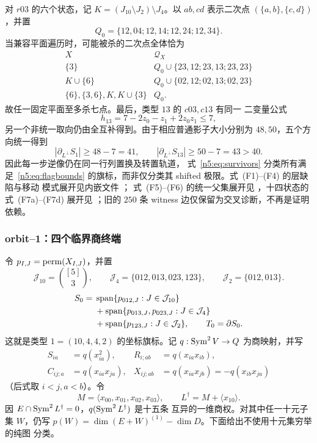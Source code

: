 对 \(r03\) 的六个状态，记
\(K=(J_{10}\setminus J_2)\setminus J_4\)。以 \(ab,cd\) 表示二次点
\((\{a,b\},\{c,d\})\)，并置
\[
Q_0=\{12,04;12,14;12,24;12,34\}.
\]
当兼容平面遍历时，可能被杀的二次点全体恰为
\[
\begin{array}{c|c}
X&\mathcal Q_X\\ \hline
\{3\}&Q_0\cup\{23,12;23,13;23,23\}\\
K\cup\{6\}&Q_0\cup\{02,12;02,13;02,23\}\\
\{6\},\{3,6\},K,K\cup\{3\}&Q_0.
\end{array}                                                     \tag{F7c}
\]
故任一固定平面至多杀七点。最后，类型 \(13\) 的 \(c03,c13\) 有同一
二变量公式
\[
h_{13}=7-2z_0-z_1+2z_0z_1\le7,                              \tag{F7d}
\]
另一个非统一取向仍由全互补得到。由于相应普通影子大小分别为
\(48,50\)，五个方向统一得到
\[
|\partial_{L^\perp}S_1|\ge48-7=41,\qquad
|\partial_{L^\perp}S_{13}|\ge50-7=43>40.                    \tag{F7}
\]
因此每一步逆像仍在同一行列置换及转置轨道，
式~\eqref{n5:eq:survivors} 分类所有满足~\eqref{n5:eq:flagbounds}
的旗标，而非仅分类其 shifted 极限。式~(F1)--(F4) 的层缺陷与移动
模式展开见内嵌文件
；
式~(F5)--(F6) 的统一父集展开见
，十四状态的
式~(F7a)--(F7d) 展开见
；旧的
\(250\) 条 witness 边仅保留为交叉诊断，不再是证明依赖。

\subsubsection{orbit--1：四个临界商终端}

令 \(p_{I,J}=\operatorname{perm}(X_{I,J})\)，并置
\[
\mathcal J_{10}=\binom{[5]}3,\qquad
\mathcal J_4=\{012,013,023,123\},\qquad
\mathcal J_2=\{012,013\}.
\]
\[
\begin{aligned}
 S_0={}&\operatorname{span}\{p_{012,J}:J\in\mathcal J_{10}\}\\
 &+\operatorname{span}\{p_{013,J},p_{023,J}:J\in\mathcal J_4\}\\
 &+\operatorname{span}\{p_{123,J}:J\in\mathcal J_2\},
 \qquad T_0=\partial S_0 .
\end{aligned}
\]
这就是类型 \(1=(10,4,4,2)\) 的坐标旗标。记 \(q:\operatorname{Sym}^2V\to Q\)
为商映射，并写
\[
\begin{aligned}
S_{ia}&=q(x_{ia}^2),&
R_{i;ab}&=q(x_{ia}x_{ib}),\\
C_{ij;a}&=q(x_{ia}x_{ja}),&
X_{ij;ab}&=q(x_{ia}x_{jb})=-q(x_{ib}x_{ja})
\end{aligned}
\]
（后式取 \(i<j,a<b\)）。令
\[
 M=\langle x_{00},x_{01},x_{02},x_{03}\rangle,\qquad
 L^\dagger=M+\langle x_{10}\rangle .
\]
因 \(E\cap\operatorname{Sym}^2L^\dagger=0\)，\(q(\operatorname{Sym}^2L^\dagger)\) 是十五条
互异的一维商权。对其中任一十元子集 \(W\)，仍写
\(p(W)=\dim(E+W)^{(1)}-\dim D\)。下面给出不使用十元集穷举的纯图
分类。

